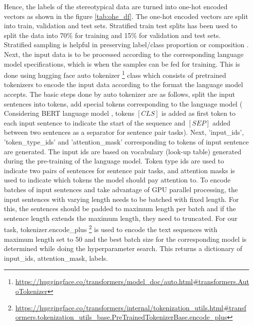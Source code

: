 Hence, the labels of the stereotypical data are turned into one-hot encoded vectors as shown in the figure \ref{tab:ohe_df}. The one-hot encoded vectors are split into train, validation and test sets. Stratified train test splits  has been used to split the data into 70\% for training and 15\% for validation and test sets. Stratified sampling is helpful in preserving label/class proportion or composition \cite{merrillees2021stratified}. Next, the input data is to be processed according to the corresponding language model specifications, which is when the samples can be fed for training. This is done using hugging face auto tokenizer \footnote{\url{https://huggingface.co/transformers/model_doc/auto.html#transformers.AutoTokenizer}} class which consists of pretrained tokenizers to encode the input data according to the format the language model accepts. The basic steps done by auto tokenizer are as follows, split the input sentences into tokens, add special tokens corresponding to the language model ( Considering BERT language model \cite{devlin2018bert}, tokens $[CLS]$ is  added as first token to each input sentence to indicate the start of the sequence and $[SEP]$ added between two sentences as a separator for sentence pair tasks). Next, 'input\_ids', 'token\_type\_ids' and 'attention\_mask' corresponding to tokens of input sentence are generated. The input ids are based on vocabulary (look-up table) generated during the pre-training of the language model. Token type ids are used to indicate two pairs of sentences for sentence pair tasks, and attention masks is used to indicate which tokens the model should pay attention to.  To encode batches of input sentences and take advantage of GPU parallel processing, the input sentences with varying length needs to be batched with fixed length. For this, the sentences should be padded to maximum length per batch and if the sentence length extends the maximum length, they need to truncated. For our task, tokenizer.encode\_plus \footnote{\url{https://huggingface.co/transformers/internal/tokenization_utils.html#transformers.tokenization_utils_base.PreTrainedTokenizerBase.encode_plus}} is used to encode the text sequences with maximum length set to 50 and the best batch size for the corresponding model is determined while doing the hyperparameter search. This returns a dictionary of input\_ids, attention\_mask, labels. 


